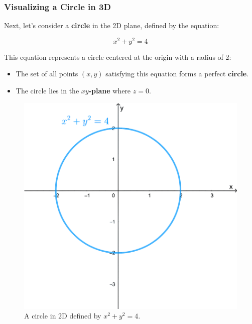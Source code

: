 \documentclass{article}
\begin{document}
\subsubsection*{Visualizing a Circle in 3D}
\begin{examplebox}
Next, let’s consider a \textbf{circle} in the 2D plane, defined by the equation:

\[
    x^2 + y^2 = 4
\]

This equation represents a circle centered at the origin with a radius of 2:

\begin{minipage}{0.55\textwidth}
    \vspace{1em}
    \begin{itemize}
        \item The set of all points \( (x, y) \) satisfying this equation forms a perfect \textbf{circle}.
        \item The circle lies in the \textbf{\( xy \)-plane} where \( z = 0 \).
    \end{itemize}
    \vspace{1em}
\end{minipage}
\begin{minipage}{0.35\textwidth}
    \begin{figure}[H]
        \centering
        \includegraphics[width=\textwidth]{x^2 + y^2 = 4.png}
        \caption{A circle in 2D defined by \( x^2 + y^2 = 4 \).}
        \label{fig:circle_2d}
    \end{figure}
\end{minipage}


\end{examplebox}
\end{document}
